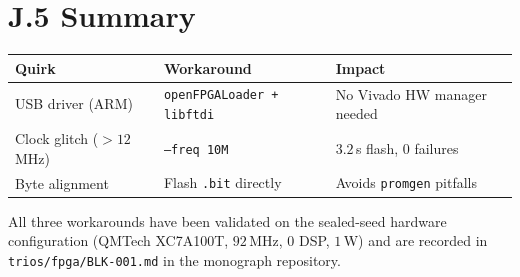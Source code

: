 \section*{J.5 Summary}
\label{app:J-summary}

\begin{center}
\begin{tabular}{llp{5.5cm}}
Quirk & Workaround & Impact \\\hline
USB driver (ARM) & \texttt{openFPGALoader + libftdi} & No Vivado HW manager needed \\
Clock glitch ($>12$\,MHz) & \texttt{--freq 10M} & $3.2$\,s flash, $0$ failures \\
Byte alignment & Flash \texttt{.bit} directly & Avoids \texttt{promgen} pitfalls \\
\end{tabular}
\end{center}

All three workarounds have been validated on the sealed-seed
hardware configuration (QMTech XC7A100T, $92$\,MHz, $0$ DSP,
$1$\,W) and are recorded in \texttt{trios/fpga/BLK-001.md} in the
monograph repository.
